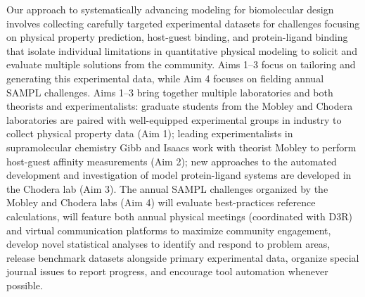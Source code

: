 \documentclass[11pt]{article}
\begin{document}
Our approach to systematically advancing modeling for biomolecular design involves collecting carefully targeted experimental datasets for challenges focusing on physical property prediction, host-guest binding, and protein-ligand binding that isolate individual limitations in quantitative physical modeling to solicit and evaluate multiple solutions from the community.
Aims 1--3 focus on tailoring and generating this experimental data, while Aim 4 focuses on fielding annual SAMPL challenges.
Aims 1--3 bring together multiple laboratories and both theorists and experimentalists: graduate students from the Mobley and Chodera laboratories are paired with well-equipped experimental groups in industry to collect physical property data (Aim 1); leading experimentalists in supramolecular chemistry Gibb and Isaacs work with theorist Mobley to perform host-guest affinity measurements (Aim 2); new approaches to the automated development and investigation of model protein-ligand systems are developed in the Chodera lab (Aim 3).
The annual SAMPL challenges organized by the Mobley and Chodera labs (Aim 4) will evaluate best-practices reference calculations, will feature both annual physical meetings (coordinated with D3R) and virtual communication platforms to maximize community engagement, develop novel statistical analyses to identify and respond to problem areas, release benchmark datasets alongside primary experimental data, organize special journal issues to report progress, and encourage tool automation whenever possible.
\end{document}
